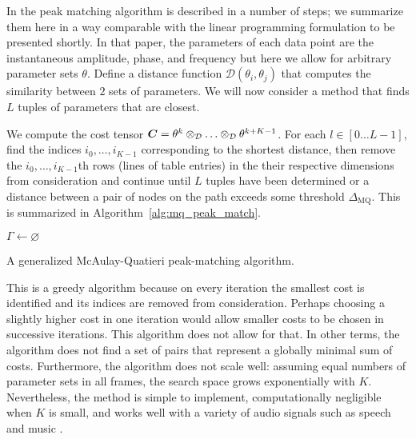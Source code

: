 \documentclass{article}
\def\argmin{\mathop{\rm arg\,min}}
\newcommand{\D}{\displaystyle}
\newcommand{\BS}[1]{\boldsymbol{#1}}
\begin{document}
\begin{sloppy}
In \cite[p.~748]{mcaulay1986speech} the peak matching algorithm is described in
a number of steps; we summarize them here in a way comparable with the linear
programming formulation to be presented shortly. In that paper, the parameters
of each data point are the instantaneous amplitude, phase, and frequency but
here we allow for arbitrary parameter sets $\theta$.  Define a distance function
$\mathcal{D} \left( \theta_{i},\theta_{j} \right)$ that computes the similarity
between $2$ sets of parameters. We will now consider a method that finds $L$
tuples of parameters that are closest.

We compute the cost tensor
$
    \BS{C} = \theta^{k}
    \otimes_{\mathcal{D}} \mathellipsis \otimes_{\mathcal{D}} \theta^{k+K-1}
$.
For each $l \in \left[0 \dotsc L-1 \right]$, find the indices
$i_{0},\dotsc,i_{K-1}$ 
corresponding to the shortest
distance, then remove the $i_{0},\dotsc,i_{K-1}$th rows (lines of table entries)
in the their respective dimensions from consideration
and continue until $L$ tuples have been determined or a distance between a pair
of nodes on the path
exceeds some
threshold $\Delta_{\text{MQ}}$. This is summarized in
Algorithm~\ref{alg:mq_peak_match}.

\begin{algorithm}
    \KwIn{the cost matrix $\BS{C}$}
    $\Gamma \leftarrow \varnothing$\;
    \For{$l \leftarrow 0$ to $L-1$}{
        $\D \Gamma_{l}=\argmin_{[0,\dotsc,M_{0}-1] \times
        \mathellipsis \times [0,\dotsc,M_{K-1}-1] \setminus \Gamma}
            \BS{C}$\;
            \If{$ \exists i,j \in \Gamma_{l} : 
            \mathcal{D} \left( \theta_{i},\theta_{j} \right) > \Delta_{\text{MQ}}$}{
            \KwRet{$\Gamma$}
        }
        $\Gamma \leftarrow \Gamma \cup C_{\Gamma_{l}}$\;
    }
    \KwRet{$\Gamma$}
    \caption{A generalized McAulay-Quatieri peak-matching algorithm.}%
    \label{alg:mq_peak_match}
\end{algorithm}

This is a greedy algorithm because on every iteration the smallest cost is
identified and its indices are removed from consideration. Perhaps choosing a
slightly higher cost in one iteration would allow smaller costs to be chosen in
successive iterations. This algorithm does not allow for that. In other terms,
the algorithm does not find a set of pairs that represent a globally minimal sum of
costs.
Furthermore, the algorithm does not scale well: assuming equal numbers of
parameter sets in all frames, the search space grows exponentially with
$K$. Nevertheless, the method is simple to implement, computationally negligible
when $K$ is small, and works well with a variety of audio signals such as speech
\cite{mcaulay1986speech} and music
\cite{smith1987parshl}.


\end{sloppy}
\end{document}
